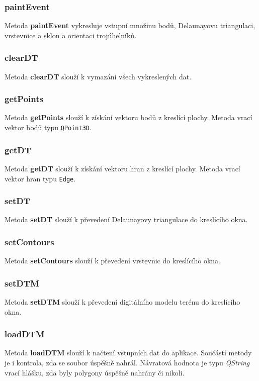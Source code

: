 \documentclass[a4paper, 12pt]{article}
\begin{document}
\subsubsection*{paintEvent}
Metoda \textbf{paintEvent} vykresluje vstupní množinu bodů, Delaunayovu triangulaci, vrstevnice a sklon a orientaci trojúhelníků.

\subsubsection*{clearDT}
Metoda \textbf{clearDT} slouží k vymazání všech vykreslených dat.

\subsubsection*{getPoints}
Metoda \textbf{getPoints} slouží k získání vektoru bodů z kreslící plochy. Metoda vrací vektor bodů typu \texttt{QPoint3D}.

\subsubsection*{getDT}
Metoda \textbf{getDT} slouží k získání vektoru hran z kreslící plochy. Metoda vrací vektor hran typu \texttt{Edge}.

\subsubsection*{setDT}
Metoda \textbf{setDT} slouží k převedení Delaunayovy triangulace do kreslícího okna.

\subsubsection*{setContours}
Metoda \textbf{setContours} slouží k převedení vrstevnic do kreslícího okna.

\subsubsection*{setDTM}
Metoda \textbf{setDTM} slouží k převedení digitálního modelu terénu do kreslícího okna.

\subsubsection*{loadDTM}
Metoda \textbf{loadDTM} slouží k načtení vstupních dat do aplikace. Součástí metody je i kontrola, zda se soubor úspěšně nahrál. Návratová hodnota je typu \textsl{QString} vrací hlášku, zda byly polygony úspěšně nahrány či nikoli.
\end{document}
